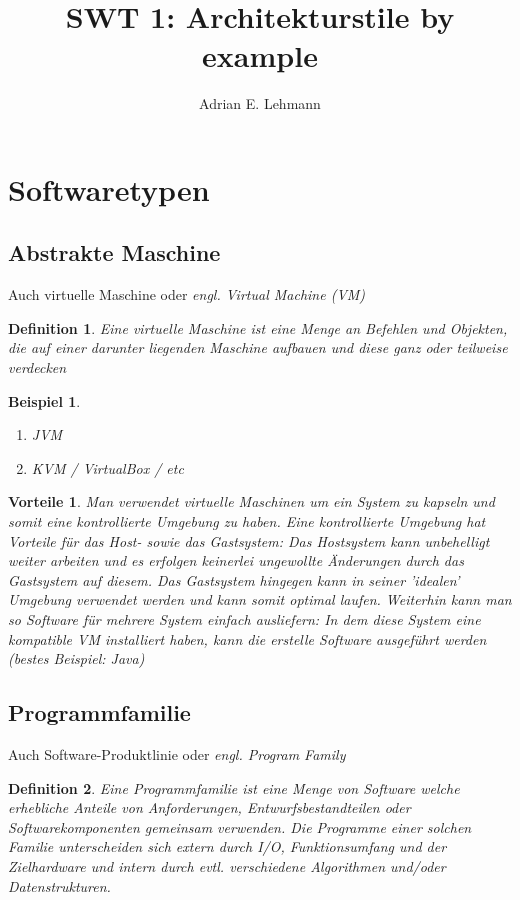 \documentclass[a4paper]{article}
\title{SWT 1: Architekturstile by example}
\author{Adrian E. Lehmann}
\theoremstyle{break}
\newtheorem{defi}{Definition}[section]
\newtheorem{ex}{Beispiel}[section]
\newtheorem{why}{Vorteile}[section]
\begin{document}
	\maketitle
	\tableofcontents
	\newpage
	

\section{Softwaretypen}
\subsection{Abstrakte Maschine}
Auch virtuelle Maschine oder \textit{engl. Virtual Machine (VM)}
\begin{defi}
	Eine virtuelle Maschine ist eine Menge an Befehlen und Objekten, die auf einer darunter liegenden Maschine aufbauen und diese ganz oder teilweise verdecken
\end{defi}

\begin{ex}
\begin{enumerate}
	\item JVM
	\item KVM / VirtualBox / etc
\end{enumerate}
\end{ex}

\begin{why}
		Man verwendet virtuelle Maschinen um ein System zu kapseln und somit eine kontrollierte Umgebung zu haben. Eine kontrollierte Umgebung hat Vorteile für das Host- sowie das Gastsystem: Das Hostsystem kann unbehelligt weiter arbeiten und es erfolgen keinerlei ungewollte Änderungen durch das Gastsystem auf diesem. Das Gastsystem hingegen kann in seiner 'idealen' Umgebung verwendet werden und kann somit optimal laufen. Weiterhin kann man so Software für mehrere System einfach ausliefern: In dem diese System eine kompatible VM installiert haben, kann die erstelle Software ausgeführt werden (bestes Beispiel: Java)
\end{why}

\subsection{Programmfamilie}
Auch Software-Produktlinie oder \textit{engl. Program Family}
\begin{defi}
	Eine Programmfamilie ist eine Menge von Software welche erhebliche Anteile von Anforderungen, Entwurfsbestandteilen oder Softwarekomponenten gemeinsam verwenden.
	Die Programme einer solchen Familie unterscheiden sich extern durch I/O, Funktionsumfang und der Zielhardware und intern durch evtl. verschiedene Algorithmen und/oder Datenstrukturen.
\end{defi}
\end{document}
